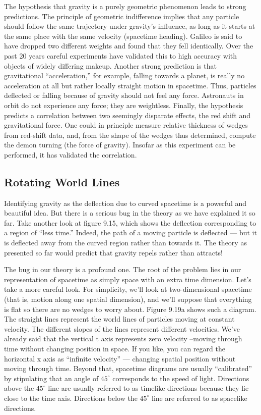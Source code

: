 \documentclass{book}
\begin{document}
The hypothesis that gravity is a purely geometric phenomenon leads to
strong predictions. The principle of geometric indifference implies that
any particle should follow the same trajectory under gravity's influence,
as long as it starts at the same place with the same velocity (spacetime
heading). Galileo is said to have dropped two different weights and found
that they fell identically. Over the past 20 years careful experiments
have validated this to high accuracy with objects of widely differing
makeup. Another strong prediction is that gravitational ``acceleration,''
for example, falling towards a planet, is really no acceleration at all but
rather locally straight motion in spacetime. Thus, particles deflected
or falling because of gravity should not feel any force. Astronauts in
orbit do not experience any force; they are weightless. Finally, the
hypothesis predicts a correlation between two seemingly disparate effects,
the red shift and gravitational force. One could in principle measure
relative thickness of wedges from red-shift data, and, from the shape of
the wedges thus determined, compute the demon turning (the force of
gravity). Insofar as this experiment can be performed, it has validated
the correlation.

\subsection{Rotating World Lines}

Identifying gravity as the deflection due to curved spacetime is a powerful
and beautiful idea. But there is a serious bug in the theory as we have
explained it so far. Take another look at figure 9.15, which shows the
deflection corresponding to a region of ``less time.'' Indeed, the path of
a moving particle is deflected --- but it is deflected away from the curved
region rather than towards it. The theory as presented so far would
predict that gravity repels rather than attracts!

The bug in our theory is a profound one. The root of the problem lies
in our representation of spacetime as simply space with an extra time
dimension. Let's take a more careful look. For simplicity, we'll look at
two-dimensional spacetime (that is, motion along one spatial dimension),
and we'll suppose that everything is flat so there are no wedges to worry
about. Figure 9.19a shows such a diagram. The straight lines represent
the world lines of particles moving at constant velocity. The different
slopes of the lines represent different velocities.
We've already said that the vertical t axis represents zero velocity --moving through time without changing position in space. If you like,
you can regard the horizontal x axis as ``infinite velocity'' --- changing
spatial position without moving through time. Beyond that, spacetime
diagrams are usually ``calibrated'' by stipulating that an angle of $45^{\circ}$
corresponds to the speed of light. Directions above the $45^{\circ}$ line are
usually referred to as timelike directions because they lie close to the
time axis. Directions below the $45^{\circ}$ line are referred to as spacelike
directions.
\end{document}

